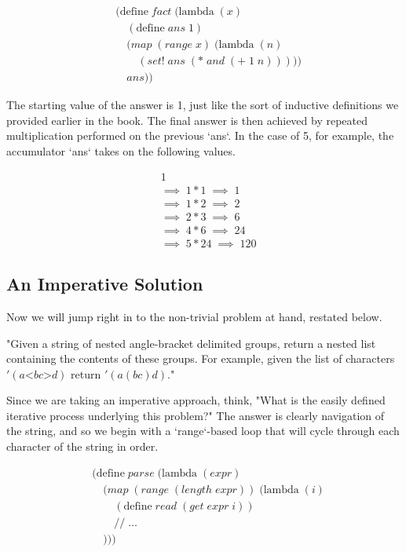 \begin{align*}
& (\text{define} \; fact \; (\text{lambda} \; (x)
\\& \quad (\text{define} \; ans \; 1)
\\& \quad (map \; (range \; x) \; (\text{lambda} \; (n)
\\& \qquad (set! \; ans \; (* \; and \; (+ \; 1 \; n)))))
\\& \quad ans))
\end{align*}

The starting value of the answer is 1, just like the sort of inductive definitions we 
provided earlier in the book. The final answer is then achieved by repeated 
multiplication performed on the previous `ans`. In the case of 5, for example, the 
accumulator `ans` takes on the following values.

\begin{align*}
& 1
\\& \implies \; 1*1 \; \implies \; 1
\\& \implies \; 1*2 \; \implies \; 2
\\& \implies \; 2*3 \; \implies \; 6
\\& \implies \; 4*6 \; \implies \; 24
\\& \implies \; 5*24 \; \implies \; 120
\end{align*}

\subsection{An Imperative Solution}
Now we will jump right in to the non-trivial problem at hand, restated below.

"Given a string of nested angle-bracket delimited groups, return a
nested list containing the contents of these groups. For example,
given the list of characters $'(a \text{<} b c \text{>} d)$ return $'(a (b c) d)$."

Since we are taking an imperative approach, think, "What is the easily defined iterative 
process underlying this problem?" The answer is clearly navigation of the string, and so 
we begin with a `range`-based loop that will cycle through each character of the string 
in order.

\begin{align*}
& (\text{define} \; parse \; (\text{lambda} \; (expr) \; 
\\& \quad (map \; (range \; (length \; expr)) \; (\text{lambda} \; (i)
\\& \qquad (\text{define} \; read \; (get \; expr \; i))
\\& \qquad // \; \dots
\\& \quad )))
\end{align*}


